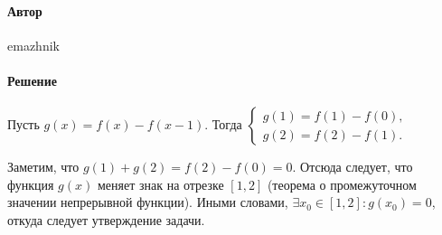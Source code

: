 \documentclass{article}
\begin{document}
\paragraph{Автор} emazhnik
\paragraph{Решение} Пусть $g(x) = f(x) - f(x-1)$. Тогда
$\begin{cases}
g(1) = f(1) - f(0), \\
g(2) = f(2) - f(1).
\end{cases}$

Заметим, что $g(1) + g(2) = f(2) - f(0) = 0$. Отсюда следует, что функция $g(x)$ меняет знак на отрезке $[1,2]$ (теорема о промежуточном значении непрерывной функции).
Иными словами, $\exists x_0 \in [1,2]: g(x_0)=0$, откуда следует утверждение задачи.
\end{document}
